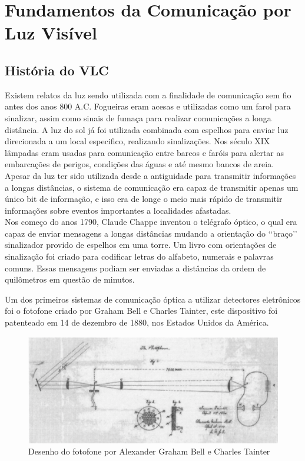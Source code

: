 \part{Fundamentos da Comunicação por Luz Visível}

\chapter[HISTÓRICO]{História do VLC}

Existem relatos da luz sendo utilizada com a finalidade de comunicação sem fio antes
dos anos 800 A.C. Fogueiras eram acesas e utilizadas como um farol para sinalizar,
 assim como sinais de fumaça para realizar comunicações a longa distância. A luz do sol 
 já foi utilizada combinada com espelhos para enviar luz direcionada a um local especifico, realizando sinalizações. 
 Nos século XIX lâmpadas eram usadas para comunicação entre barcos e faróis para 
 alertar as embarcações de perigos, condições das águas e até mesmo bancos de areia.\\

Apesar da luz ter sido utilizada desde a antiguidade para transmitir informações a longas distâncias, o sistema de comunicação era capaz de transmitir apenas um único bit de informação, e isso era de longe o meio mais rápido de transmitir informações sobre eventos importantes a localidades afastadas.\\

Nos começo do anos 1790, Claude Chappe inventou o telégrafo óptico, o qual era capaz de enviar mensagens a longas distâncias mudando a orientação do \lq\lq braço\rq\rq \: sinalizador provido de espelhos em uma torre. Um livro com orientações de sinalização foi criado para codificar letras do alfabeto, numerais e palavras comuns. Essas mensagens podiam ser enviadas a distâncias da ordem de quilômetros em questão de minutos.\cite{Standage:1998}

Um dos primeiros sistemas de comunicação óptica a utilizar detectores eletrônicos foi o fotofone criado por Graham Bell e Charles Tainter, este dispositivo foi patenteado em 14 de dezembro de 1880, nos Estados Unidos da América.\cite{Azzawi} 

\begin{figure}
	\centering
	\label{Desenho do fotofone por Alexander Graham Bell e Charles Tainter}
		\includegraphics[width = 12cm]{figuras/fotofone}
	\caption{Desenho do fotofone por Alexander Graham Bell e Charles Tainter \cite{Hranilovic}}
\end{figure}

